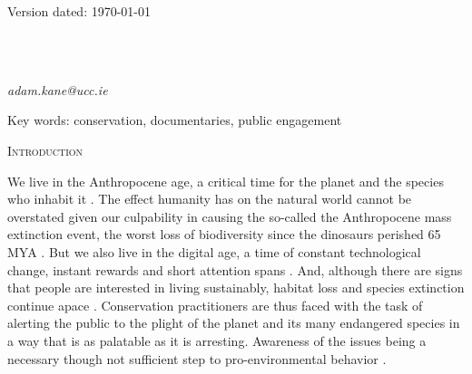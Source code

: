 \documentclass[12pt,letterpaper]{article}
\renewcommand{\section}[1]{%
\bigskip
\begin{center}
\begin{Large}
\normalfont\scshape #1
\medskip
\end{Large}
\end{center}}
\begin{document}
\begin{flushright}
Version dated: \today
\end{flushright}

\bigskip
\medskip
\begin{center}


\bigskip

\\
\\

\end{center}
\medskip
{} \textit{adam.kane@ucc.ie}\\  
\vspace{1in}


%
%
\begin{abstract}
\end{abstract}

\noindent Key words: conservation, documentaries, public engagement\\


%
%

\newpage 
\section{Introduction}
We live in the Anthropocene age, a critical time for the planet and the species who inhabit it \cite{rands2010biodiversity}. The effect humanity has on the natural world cannot be overstated given our culpability in causing the so-called the Anthropocene mass extinction event, the worst loss of biodiversity since the dinosaurs perished 65 MYA \cite{barnosky2011has}. But we also live in the digital age, a time of constant technological change, instant rewards and short attention spans \cite{owen2009internet}. And, although there are signs that people are interested in living sustainably, habitat loss and species extinction continue apace \cite{rands2010biodiversity}. Conservation practitioners are thus faced with the task of alerting the public to the plight of the planet and its many endangered species in a way that is as palatable as it is arresting. Awareness of the issues being a necessary though not sufficient step to pro-environmental behavior \cite{kollmuss2002mind}.
\end{document}
